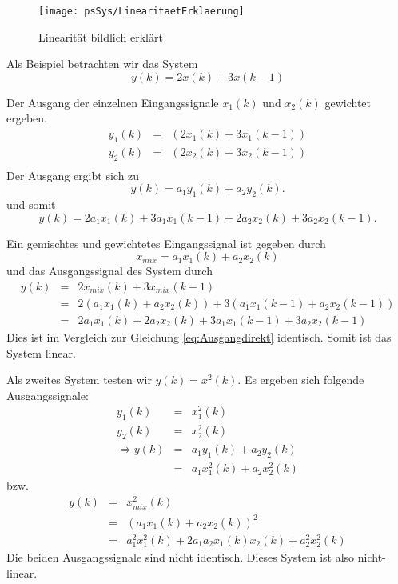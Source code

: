 \begin{figure}[H]
\begin{center}
\texttt{[image: psSys/LinearitaetErklaerung]}
\caption{\label{pic:Linearitaet} Linearität bildlich erklärt}
\end{center}
\end{figure}

\begin{example}
Als Beispiel betrachten wir das System
\begin{equation}
y(k) = 2x(k) + 3x(k-1)
\end{equation}

Der Ausgang der einzelnen Eingangssignale $x_1(k)$ und $x_2(k)$
gewichtet ergeben.
\begin{eqnarray}
y_1(k) &= & (2x_1(k) + 3x_1(k-1))\\
y_2(k) &= & (2x_2(k) + 3x_2(k-1))\\
\end{eqnarray}
Der Ausgang ergibt sich zu
\begin{equation}\label{eq:Ausgangdirekt}
y(k) = a_1 y_1(k)+ a_2 y_2(k).
\end{equation}
und somit
\begin{equation}\label{eq:AusgangdirektFinal}
y(k) = 2 a_1  x_1(k) + 3 a_1 x_1(k-1)+  2 a_2 x_2(k) + 3 a_2 x_2(k-1) .
\end{equation}

Ein gemischtes und gewichtetes Eingangssignal ist gegeben durch
\begin{equation}
x_{mix} = a_1 x_1(k) + a_2 x_2(k)
\end{equation}
und das Ausgangssignal des System durch
\begin{eqnarray}
y(k) &=& 2x_{mix}(k) + 3x_{mix}(k-1)\\\nonumber
& = & 2(a_1 x_1(k) + a_2 x_2(k)) + 3(a_1 x_1(k-1) + a_2 x_2(k-1))\\\nonumber
& = & 2a_1x_1(k) + 2 a_2 x_2(k) + 3 a_1 x_1(k-1) + 3 a_2 x_2(k-1)
\end{eqnarray}
Dies ist im Vergleich zur Gleichung \ref{eq:Ausgangdirekt}
identisch. Somit ist das System linear.

Als zweites System testen wir $y(k) = x^2(k)$. Es ergeben sich
folgende Ausgangssignale:
\begin{eqnarray}
y_1(k) & = & x_1^2 (k)\\
y_2(k) & = & x_2^2 (k)\\
\Rightarrow y(k) &= &a_1 y_1(k) + a_2 y_2(k)\\
& = & a_1  x_1^2 (k) + a_2  x_2^2 (k)
\end{eqnarray}
bzw.
\begin{eqnarray}
y(k) &= &  x_{mix}^2 (k)\\
& = & \left( a_1  x_1 (k) + a_2  x_2 (k) \right)^2\\
 & = & a_1^2 x_1^2 (k) + 2a_1 a_2 x_1(k) x_2(k) + a_2^2 x_2^2 (k)
\end{eqnarray}
Die beiden Ausgangssignale sind nicht identisch. Dieses System ist
also nicht-linear.
\end{example}

